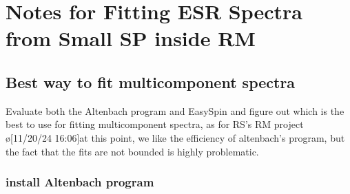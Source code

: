 \section{Notes for Fitting ESR Spectra from Small SP inside RM}
\subsection{Best way to fit multicomponent spectra}
Evaluate both the Altenbach program and
EasySpin and figure out which is the best to
use for fitting multicomponent spectra, as
for RS's RM project
\o[11/20/24 16:06]{at this point, we like the efficiency of altenbach's program, but the fact that the fits are not bounded is highly problematic.}

\subsubsection{install Altenbach program}\label{sec:JFaltenbach}

